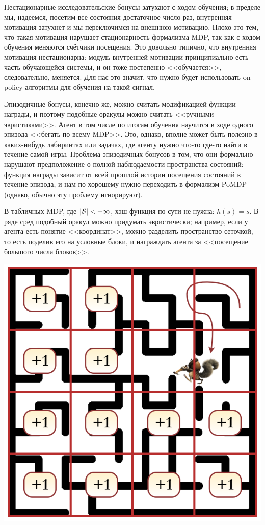 Нестационарные исследовательские бонусы затухают с ходом обучения; в пределе мы, надеемся, посетим все состояния достаточное число раз, внутренняя мотивация затухнет и мы переключимся на внешнюю мотивацию. Плохо это тем, что такая мотивация нарушает стационарность формализма MDP, так как с ходом обучения меняются счётчики посещения. Это довольно типично, что внутренняя мотивация нестационарна: модуль внутренней мотивации принципиально есть часть обучающейся системы, и он тоже постепенно <<обучается>>, следовательно, меняется. Для нас это значит, что нужно будет использовать on-policy алгоритмы для обучения на такой сигнал.

Эпизодичные бонусы, конечно же, можно считать модификацией функции награды, и поэтому подобные оракулы можно считать <<ручными эвристиками>>. Агент в том числе по итогам обучения научится в ходе одного эпизода <<бегать по всему MDP>>. Это, однако, вполне может быть полезно в каких-нибудь лабиринтах или задачах, где агенту нужно что-то где-то найти в течение самой игры. Проблема эпизодичных бонусов в том, что они формально нарушают предположение о полной наблюдаемости пространства состояний: функция награды зависит от всей прошлой истории посещения состояний в течение эпизода, и нам по-хорошему нужно переходить в формализм PoMDP (однако, обычно эту проблему игнорируют).

\begin{exampleBox}[righthand ratio=0.25, sidebyside, sidebyside align=center, lower separated=false]{}
В табличных MDP, где $|\mathcal{S}| < +\infty$, хэш-функция по сути не нужна: $h(s) = s$. В ряде сред подобный оракул можно придумать эвристически; например, если у агента есть понятие <<координат>>, можно разделить пространство сеточкой, то есть поделив его на условные блоки, и награждать агента за <<посещение большого числа блоков>>. 

\tcblower
\includegraphics[width=\textwidth]{Images/maze.png}
\end{exampleBox}

